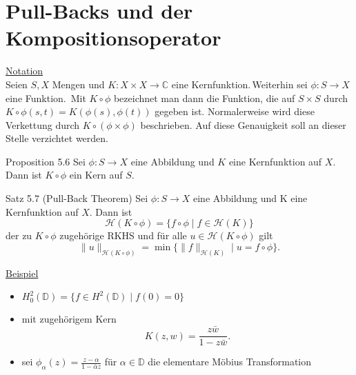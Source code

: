 \documentclass{beamer}
\begin{document}
\section{Pull-Backs und der Kompositionsoperator}
\begin{frame}
\underline{Notation}\\ \pause
Seien $S,X$ Mengen und $K:X\times X \to \mathbb{C}$ eine Kernfunktion.\,\pause Weiterhin sei $\phi:S\to X$ eine Funktion.\pause \, Mit $K\circ \phi$ bezeichnet man dann die Funktion, die auf $S\times S $ durch $K\circ \phi(s,t)=K(\phi(s),\phi(t))$ gegeben ist. Normalerweise wird diese Verkettung durch $K\circ (\phi \times \phi )$ beschrieben. \pause Auf diese Genauigkeit soll an dieser Stelle verzichtet werden.

\end{frame}
\begin{frame}
\begin{block}{Proposition 5.6}
Sei $\phi:S \to X $ eine Abbildung und $K$ eine Kernfunktion auf $X.$ Dann ist $K \circ \phi$ ein Kern auf $S.$
\end{block}
\end{frame}

\begin{frame}
\begin{block}{Satz 5.7 (Pull-Back Theorem)}
Sei $\phi:S \to X$ eine Abbildung und K eine Kernfunktion auf $X.$ Dann ist 
\[
\mathcal{H}(K \circ \phi)=\{f\circ \phi \mid f \in \mathcal{H}(K)\}
\] der zu $K\circ \phi$ zugehörige RKHS und für alle $u \in \mathcal{H}(K\circ \phi)$ gilt
\[
\|u\|_{\mathcal{H}(K\circ \phi)}=\min\{\|f\|_{\mathcal{H}(K)}\mid u=f\circ \phi\}.
\]
\end{block}
\end{frame}
\begin{frame}
\underline{Beispiel}
\begin{itemize}
 \item $H^2_0(\mathbb{D})=\{f\in H^2(\mathbb{D})\mid f(0)=0\}$\pause  
 \item mit zugehörigem Kern
\[
K(z,w)=\frac{z\bar{w}}{1-z\bar{w}}.
\]\pause
\item sei $\phi_{\alpha}(z)=\frac{z-\alpha}{1-\bar{\alpha}z}$ für $\alpha\in \mathbb{D}$ die elementare Möbius Transformation
\end{itemize}
\end{frame}
\end{document}
